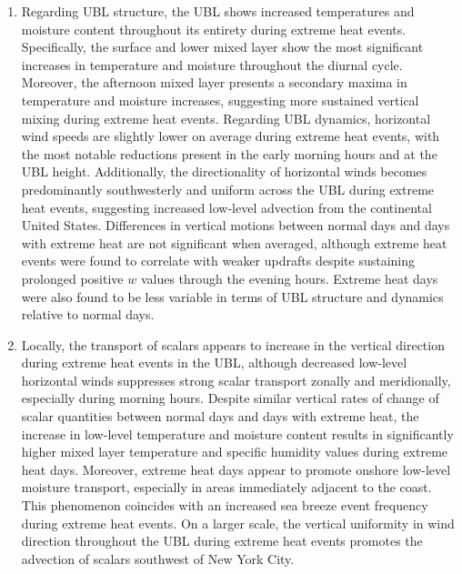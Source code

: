 \documentclass[11pt,a4paper]{article}
\begin{document}
\begin{enumerate}
	\item Regarding UBL structure, the UBL shows increased temperatures and moisture content throughout its entirety during extreme heat events. Specifically, the surface and lower mixed layer show the most significant increases in temperature and moisture throughout the diurnal cycle. Moreover, the afternoon mixed layer presents a secondary maxima in temperature and moisture increases, suggesting more sustained vertical mixing during extreme heat events. Regarding UBL dynamics, horizontal wind speeds are slightly lower on average during extreme heat events, with the most notable reductions present in the early morning hours and at the UBL height. Additionally, the directionality of horizontal winds becomes predominantly southwesterly and uniform across the UBL during extreme heat events, suggesting increased low-level advection from the continental United States. Differences in vertical motions between normal days and days with extreme heat are not significant when averaged, although extreme heat events were found to correlate with weaker updrafts despite sustaining prolonged positive $w$ values through the evening hours. Extreme heat days were also found to be less variable in terms of UBL structure and dynamics relative to normal days.
	\item Locally, the transport of scalars appears to increase in the vertical direction during extreme heat events in the UBL, although decreased low-level horizontal winds suppresses strong scalar transport zonally and meridionally, especially during morning hours. Despite similar vertical rates of change of scalar quantities between normal days and days with extreme heat, the increase in low-level temperature and moisture content results in significantly higher mixed layer temperature and specific humidity values during extreme heat days. Moreover, extreme heat days appear to promote onshore low-level moisture transport, especially in areas immediately adjacent to the coast. This phenomenon coincides with an increased sea breeze event frequency during extreme heat events. On a larger scale, the vertical uniformity in wind direction throughout the UBL during extreme heat events promotes the advection of scalars southwest of New York City. 

\end{enumerate}
\end{document}

